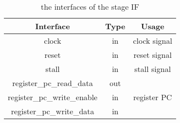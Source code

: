 \begin{table}[!h]
\centering
\begin{tabular}{ccc}
\toprule
Interface & Type & Usage \\ \midrule
clock & in & clock signal \\ \hline
reset & in & reset signal \\ \hline
stall & in & stall signal \\ \hline
register\_pc\_read\_data & out & \multirow{3}{*}{register PC} \\ \cline{1-2}
register\_pc\_write\_enable & in &  \\ \cline{1-2}
register\_pc\_write\_data & in &  \\ \bottomrule
\end{tabular}
\caption{the interfaces of the stage IF}
\end{table}